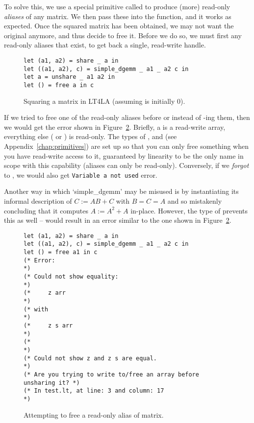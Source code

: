 To solve this, we use a special primitive called  to produce
(more) read-only \emph{aliases} of any matrix. We then pass these into the
function, and it works as expected. Once the squared matrix has been obtained,
we may not want the original anymore, and thus decide to free it. Before we do
so, we must first  any read-only aliases that exist, to get back
a single, read-write handle.

\begin{figure}[tp]
    \begin{verbatim}
let (a1, a2) = share _ a in
let ((a1, a2), c) = simple_dgemm _ a1 _ a2 c in
let a = unshare _ a1 a2 in
let () = free a in c
    \end{verbatim}
    \caption{Squaring a matrix in LT4LA (assuming  is initially
        0).}\label{fig:ltfla_square}
\end{figure}

If we tried to free one of the read-only aliases before or instead of
-ing them, then we would get the error shown in
Figure~\ref{fig:ltfla_free}. Briefly, a  is a read-write array,
everything else ( or ) is read-only. The types of
,  and  (see
Appendix~\ref{chap:primitives}) are set up so that you can only free something
when you have read-write access to it, guaranteed by linearity to be the only
name in scope with this capability (aliases can only be read-only). Conversely,
if we \emph{forgot} to , we would also get \texttt{Variable a not
used} error.

Another way in which `simple\_dgemm' may be misused is by instantiating its
informal description of $C := AB + C$ with $B = C = A$ and so mistakenly
concluding that it computes $A := A^2 + A$ in-place. However, the type of
 prevents this as well --  would result in an error similar to the one shown
in Figure~\ref{fig:ltfla_free}.

\begin{figure}[tp]
    \begin{verbatim}
let (a1, a2) = share _ a in
let ((a1, a2), c) = simple_dgemm _ a1 _ a2 c in
let () = free a1 in c
(* Error:                                                        *)
(* Could not show equality:                                      *)
(*     z arr                                                     *)
(* with                                                          *)
(*     z s arr                                                   *)
(*                                                               *)
(* Could not show z and z s are equal.                           *)
(* Are you trying to write to/free an array before unsharing it? *)
(* In test.lt, at line: 3 and column: 17                         *)
    \end{verbatim}
    \caption{Attempting to free a read-only alias of matrix.}\label{fig:ltfla_free}
\end{figure}


